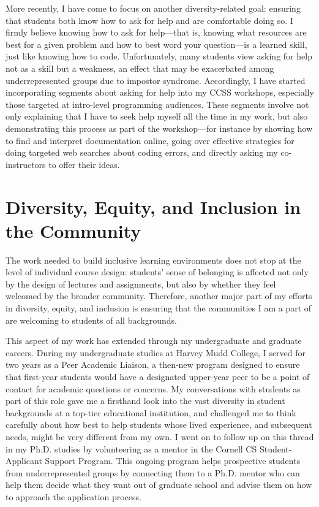 \documentclass[12pt,letterpaper]{article}
\begin{document}
More recently, I have come to focus on another diversity-related goal: ensuring that students both know how to ask for help and are comfortable doing so.
I firmly believe knowing how to ask for help---that is, knowing what resources are best for a given problem and how to best word your question---is a learned skill, just like knowing how to code.
Unfortunately, many students view asking for help not as a skill but a weakness, an effect that may be exacerbated among underrepresented groups due to impostor syndrome.
Accordingly, I have started incorporating segments about asking for help into my CCSS workshops, especially those targeted at intro-level programming audiences.
These segments involve not only explaining that I have to seek help myself all the time in my work, but also demonstrating this process as part of the workshop---for instance by showing how to find and interpret documentation online, going over effective strategies for doing targeted web searches about coding errors, and directly asking my co-instructors to offer their ideas.

\section{Diversity, Equity, and Inclusion in the Community}
The work needed to build inclusive learning environments does not stop at the level of individual course design: students' sense of belonging is affected not only by the design of lectures and assignments, but also by whether they feel welcomed by the broader community.
Therefore, another major part of my efforts in diversity, equity, and inclusion is ensuring that the communities I am a part of are welcoming to students of all backgrounds.

This aspect of my work has extended through my undergraduate and graduate careers.
During my undergraduate studies at Harvey Mudd College, I served for two years as a Peer Academic Liaison, a then-new program designed to ensure that first-year students would have a designated upper-year peer to be a point of contact for academic questions or concerns.
My conversations with students as part of this role gave me a firsthand look into the vast diversity in student backgrounds at a top-tier educational institution, and challenged me to think carefully about how best to help students whose lived experience, and subsequent needs, might be very different from my own.
I went on to follow up on this thread in my Ph.D. studies by volunteering as a mentor in the Cornell CS Student-Applicant Support Program.
This ongoing program helps prospective students from underrepresented groups by connecting them to a Ph.D. mentor who can help them decide what they want out of graduate school and advise them on how to approach the application process.
\end{document}
